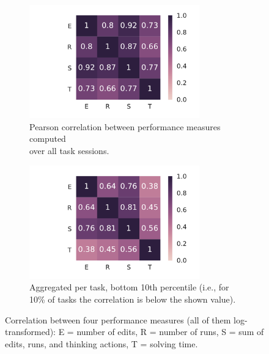 \begin{figure}[htb]
\centering
\begin{subfigure}{.49\textwidth}
\centering
\includegraphics[height=49mm,trim={34mm 0 11mm 0},clip]{img/performance-corr-ts}
\caption{Pearson correlation between performance measures computed\\over all task sessions.}
\label{fig:performance-corrs-ts}
\end{subfigure}
\begin{subfigure}{.49\textwidth}
\centering
\includegraphics[height=49mm,trim={34mm 0 11mm 0},clip]{img/performance-corr-tasks-q10}
\caption{Aggregated per task, bottom 10th percentile
  (i.e., for 10\% of tasks the correlation is below the shown value).}
\label{fig:performance-corrs-p10}
\end{subfigure}
\caption{Correlation between four performance measures
(all of them log-transformed):
E = number of edits, R = number of runs, S = sum of edits, runs, and thinking actions,
T = solving time.}
\label{fig:performance-corrs}
\end{figure}


